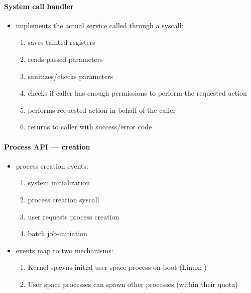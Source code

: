 \paragraph{System call handler}
\begin{itemize}
  \item implements the actual service called through a syscall:
  \begin{enumerate}
    \item saves tainted registers
    \item reads passed parameters
    \item sanitizes/checks parameters
    \item checks if caller has enough permissions to perform the requested action
    \item performs requested action in behalf of the caller
    \item returns to caller with success/error code
  \end{enumerate}
\end{itemize}

\paragraph{Process API --- creation}
\begin{itemize}
  \item process creation events:
  \begin{enumerate}
    \item system initialization
    \item process creation syscall
    \item user requests process creation
    \item batch job-initiation
  \end{enumerate}
  \item events map to two mechanisms:
  \begin{enumerate}
    \item Kernel spawns initial user space process on boot (Linux: )
    \item User space processes can spawn other processes (within their quota)
  \end{enumerate}
\end{itemize}

